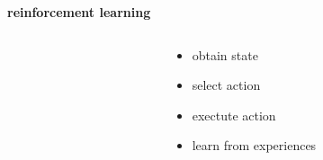 \documentclass{beamer}
\begin{document}
\begin{frame}{\bf reinforcement learning}

  \begin{columns}

    \begin{column}{0.5\textwidth}
    \end{column}

    \begin{column}{0.5\textwidth}
      \begin{itemize}
        \item obtain state
        \item select action
        \item exectute action
        \item learn from experiences
      \end{itemize}
    \end{column}

  \end{columns}

\end{frame}
\end{document}
